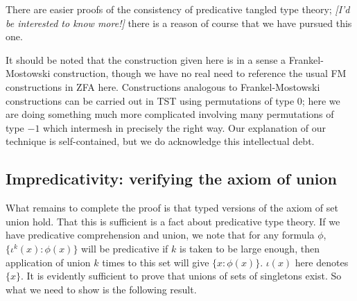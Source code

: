 \documentclass[112pt]{article}
\theoremstyle{definition}
\theoremstyle{remark}
\newcommand{\rk}[1]{{\color{blue}\sl #1}}
\begin{document}
There are easier proofs of the consistency of predicative tangled type theory; \rk{[I'd be interested to know more!]} there is a reason of course that we have pursued this one.

It should be noted that the construction given here is in a sense a Frankel-Mostowski construction, though we have no real need to reference the usual
FM constructions in ZFA here.  Constructions analogous to Frankel-Mostowski constructions can be carried out in TST using permutations of type 0;  here we are doing something much more complicated involving many permutations of type $-1$ which intermesh in precisely the right way.  Our explanation of our technique is self-contained, but we do acknowledge this intellectual debt.



\newpage
\subsection{Impredicativity:  verifying the axiom of union}\label{ss:impredicativity}

What remains to complete the proof is that typed versions of the axiom of set union hold.  That this is sufficient is a fact about predicative type theory.
If we have predicative comprehension and union, we note that for any formula $\phi$, $\{\iota^k(x):\phi(x)\}$ will be predicative if $k$ is taken to be large enough, then application of union $k$ times to this set will give $\{x:\phi(x)\}$.  $\iota(x)$ here denotes $\{x\}$.  It is evidently sufficient to prove that unions of sets of singletons exist.
{So what we need to show is the following result.}
\end{document}
